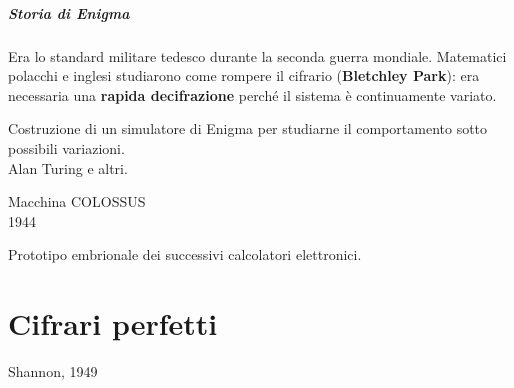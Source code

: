 \documentclass[10pt]{book}
\begin{document}
\paragraph{Storia di Enigma} Era lo standard militare tedesco durante la seconda guerra mondiale. Matematici polacchi e inglesi studiarono come rompere il cifrario (\textbf{Bletchley Park}): era necessaria una \textbf{rapida decifrazione} perché il sistema è continuamente variato.
\begin{list}{}{}
	\item Costruzione di un simulatore di Enigma per studiarne il comportamento sotto possibili variazioni.\\
	Alan Turing e altri.
	\item Macchina COLOSSUS\\
	1944
	\item Prototipo embrionale dei successivi calcolatori elettronici.
\end{list}
\chapter{Cifrari perfetti}
Shannon, 1949
\end{document}
